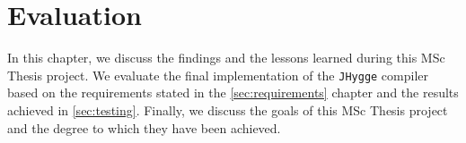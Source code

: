 \chapter{Evaluation}

In this chapter, we discuss the findings and the lessons learned during this MSc Thesis project. We evaluate the final implementation
of the \texttt{JHygge} compiler based on the requirements stated in the \ref{sec:requirements} chapter and the results achieved in
\ref{sec:testing}. Finally, we discuss the goals of this MSc Thesis project and the degree to which they have been achieved.
